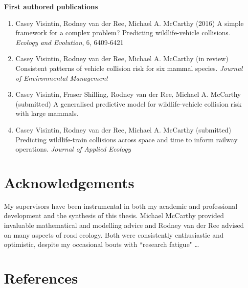 \documentclass[titlesmallcaps,copyrightpage,examinerscopy]{uomthesis}
\begin{document}
\newpage
\textbf{First authored publications}
\begin{enumerate}
\item Casey Visintin, Rodney van der Ree, Michael A. McCarthy (2016) A simple framework for a complex problem?  Predicting wildlife-vehicle collisions. \textit{Ecology and Evolution}, 6, 6409-6421

\item Casey Visintin, Rodney van der Ree, Michael A. McCarthy (in review) Consistent patterns of vehicle collision risk for six mammal species. \textit{Journal of Environmental Management}

\item Casey Visintin, Fraser Shilling, Rodney van der Ree, Michael A. McCarthy (submitted) A generalised predictive model for wildlife-vehicle collision risk with large mammals. \textit{}

\item Casey Visintin, Rodney van der Ree, Michael A. McCarthy (submitted) Predicting wildlife-train collisions across space and time to inform railway operations. \textit{Journal of Applied Ecology}
\end{enumerate}

\chapter{Acknowledgements}

My supervisors have been instrumental in both my academic and professional development and the synthesis of this thesis.  Michael McCarthy provided invaluable mathematical and modelling advice and Rodney van der Ree advised on many aspects of road ecology.  Both were consistently enthusiastic and optimistic, despite my occasional bouts with ``research fatigue" \ldots

\tableofcontents
\listoffigures
\listoftables

\mainmatter















%

{
\backmatter
\chapter{References}

}
\end{document}
